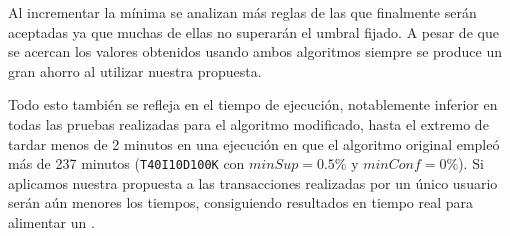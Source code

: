 Al incrementar la \confianza mínima se analizan más reglas de las que finalmente serán aceptadas ya que muchas de ellas no superarán el umbral fijado. A pesar de que se acercan los valores obtenidos usando ambos algoritmos siempre se produce un gran ahorro al utilizar nuestra propuesta.


Todo esto también se refleja en el tiempo de ejecución, notablemente inferior en todas las pruebas realizadas para el algoritmo modificado, hasta el extremo de tardar menos de 2 minutos en una ejecución en que el algoritmo original empleó más de 237 minutos (\texttt{T40I10D100K} con $minSup = 0.5\%$ y $minConf = 0\%$). Si aplicamos nuestra propuesta a las transacciones realizadas por un único usuario serán aún menores los tiempos, consiguiendo resultados en tiempo real para alimentar un \srw.





